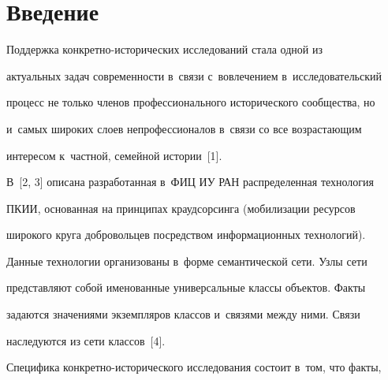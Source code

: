 









 \thispagestyle{headings}


 


 \vspace*{-10pt}


  


\section{Введение}





\vspace*{-2pt}





  Поддержка конкретно-исторических исследований стала одной из 


актуальных задач современности в~связи с~вовлечением в~исследовательский 


процесс не только членов профессионального исторического сообщества, но 


и~самых широких слоев непрофессионалов в~связи со все возрастающим 


интересом к~частной, семейной истории~[1].


  


  В~[2, 3] описана разработанная в~ФИЦ ИУ РАН распределенная технология 


ПКИИ, основанная на принципах краудсорсинга (мобилизации ресурсов 


широкого круга добровольцев посредством информационных технологий). 


Данные технологии организованы в~форме семантической сети. Узлы сети 


представляют собой именованные универсальные классы объектов. Факты 


задаются значениями экземпляров классов и~связями между ними. Связи 


наследуются из сети классов~[4].


  


  Специфика конкретно-исторического исследования состоит в~том, что факты, 


